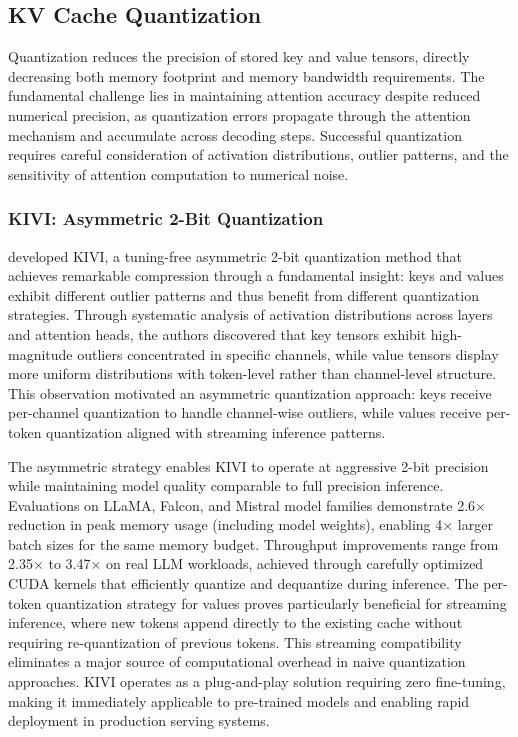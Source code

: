 \subsection{KV Cache Quantization}

Quantization reduces the precision of stored key and value tensors, directly decreasing both memory footprint and memory bandwidth requirements. The fundamental challenge lies in maintaining attention accuracy despite reduced numerical precision, as quantization errors propagate through the attention mechanism and accumulate across decoding steps. Successful quantization requires careful consideration of activation distributions, outlier patterns, and the sensitivity of attention computation to numerical noise.

\subsubsection{KIVI: Asymmetric 2-Bit Quantization}

\citet{liu2024kivi} developed KIVI, a tuning-free asymmetric 2-bit quantization method that achieves remarkable compression through a fundamental insight: keys and values exhibit different outlier patterns and thus benefit from different quantization strategies. Through systematic analysis of activation distributions across layers and attention heads, the authors discovered that key tensors exhibit high-magnitude outliers concentrated in specific channels, while value tensors display more uniform distributions with token-level rather than channel-level structure. This observation motivated an asymmetric quantization approach: keys receive per-channel quantization to handle channel-wise outliers, while values receive per-token quantization aligned with streaming inference patterns.

The asymmetric strategy enables KIVI to operate at aggressive 2-bit precision while maintaining model quality comparable to full precision inference. Evaluations on LLaMA, Falcon, and Mistral model families demonstrate 2.6$\times$ reduction in peak memory usage (including model weights), enabling 4$\times$ larger batch sizes for the same memory budget. Throughput improvements range from 2.35$\times$ to 3.47$\times$ on real LLM workloads, achieved through carefully optimized CUDA kernels that efficiently quantize and dequantize during inference. The per-token quantization strategy for values proves particularly beneficial for streaming inference, where new tokens append directly to the existing cache without requiring re-quantization of previous tokens. This streaming compatibility eliminates a major source of computational overhead in naive quantization approaches. KIVI operates as a plug-and-play solution requiring zero fine-tuning, making it immediately applicable to pre-trained models and enabling rapid deployment in production serving systems.

